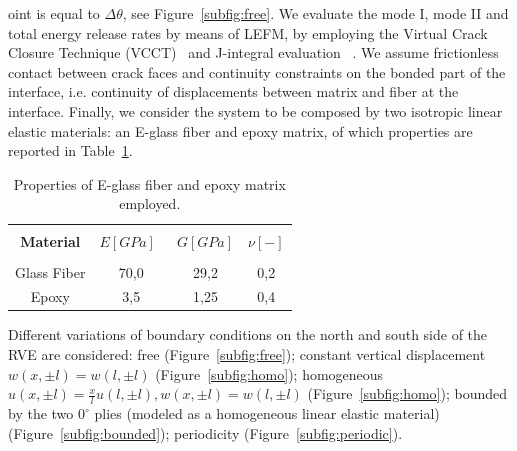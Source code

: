 \documentclass[a4paper]{jpconf}
\begin{document}
oint is equal to $\Delta\theta$, see Figure~\ref{subfig:free}. We evaluate the mode I, mode II and total energy release rates by means of LEFM, by employing the Virtual Crack Closure Technique (VCCT)~\cite{Krueger:2004,abaqus:2016} and J-integral evaluation ~\cite{Rice:1968,abaqus:2016}. We assume frictionless contact between crack faces and continuity constraints on the bonded part of the interface, i.e. continuity of displacements between matrix and fiber at the interface. Finally, we consider the system to be composed by two isotropic linear elastic materials: an E-glass fiber and epoxy matrix, of which properties are reported in Table~\ref{tab:phaseprop}.
\begin{table}[H]
  \centering
  \caption{Properties of E-glass fiber and epoxy matrix employed.}
    \begin{tabular}{cccc}
&&&\\
    \textbf{Material} & \textbf{$E\left[GPa\right]$}\ & \textbf{$G\left[GPa\right]$} & \textbf{$\nu\left[-\right]$} \\[3pt]
    \midrule\\[12pt]
    Glass Fiber    & 70,0  & 29,2   & 0,2  \\[16pt]
    Epoxy    & 3,5    & 1,25   & 0,4  

    \end{tabular}%
  \label{tab:phaseprop}%
\end{table}%
Different variations of boundary conditions on the north and south side of the RVE are considered: free (Figure~\ref{subfig:free}); constant vertical displacement $w\left(x,\pm l\right)=w\left(l,\pm l\right)$ (Figure~\ref{subfig:homo}); homogeneous $u\left(x,\pm l\right)=\frac{x}{l}u\left(l,\pm l\right),w\left(x,\pm l\right)=w\left(l,\pm l\right)$ (Figure~\ref{subfig:homo}); bounded by the two $0^{\circ}$ plies (modeled as a homogeneous linear elastic material) (Figure~\ref{subfig:bounded}); periodicity (Figure~\ref{subfig:periodic}).
\end{document}
